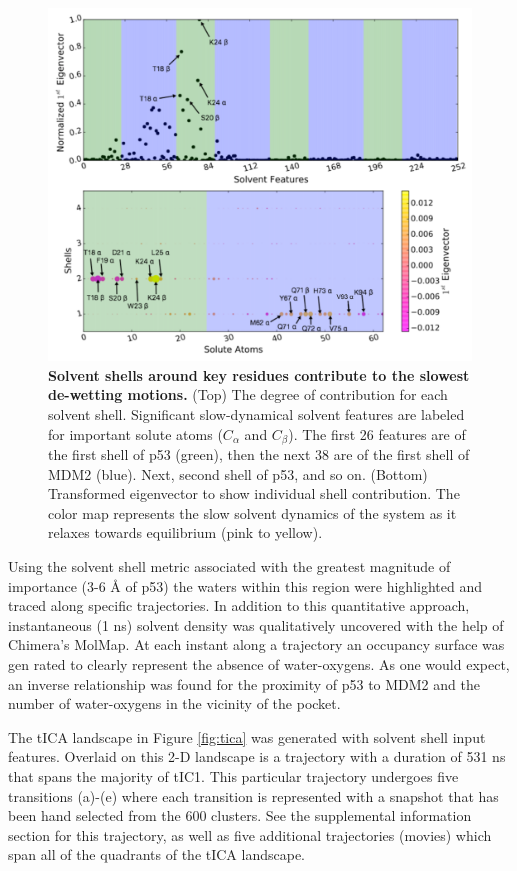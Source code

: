 \begin{figure}[h!]
\centering
\includegraphics[scale=0.5]{Figures/SolvShellFeatures/Solvent_Shell_Feature_Eigen_1.pdf}
\caption{\textbf{Solvent shells around key residues contribute
  to the slowest de-wetting motions.} (Top) The degree of contribution for each solvent shell. Significant slow-dynamical solvent features are labeled for important solute atoms ($C_{\alpha}$ and $C_{\beta}$). The first 26 features are of the first shell of p53 (green), then the next 38 are of the first shell of MDM2 (blue). Next, second shell of p53, and so on. (Bottom) Transformed eigenvector to show individual shell contribution. The color map represents the slow solvent dynamics of the system as it relaxes towards equilibrium (pink to yellow).}
\label{fig:1st_eigenvector}
\end{figure}


Using the solvent shell metric associated with the greatest magnitude of importance (3-6 Å of p53) the waters within this region were highlighted and traced along specific trajectories. In addition to this quantitative approach, instantaneous (1 ns) solvent density was qualitatively uncovered with the help of Chimera's MolMap. At each instant along a trajectory an occupancy surface was gen rated to clearly represent the absence of water-oxygens. As one would expect, an inverse relationship was found for the proximity of p53 to MDM2 and the number of water-oxygens in the vicinity of the pocket.

The tICA landscape in Figure \ref{fig:tica} was generated with solvent shell input features. Overlaid on this 2-D landscape is a trajectory with a duration of 531 ns that spans the majority of tIC1. This particular trajectory undergoes five transitions (a)-(e) where each transition is represented with a snapshot that has been hand selected from the 600 clusters. See the supplemental information section for this trajectory, as well as five additional trajectories (movies) which span all of the quadrants of the tICA landscape.

